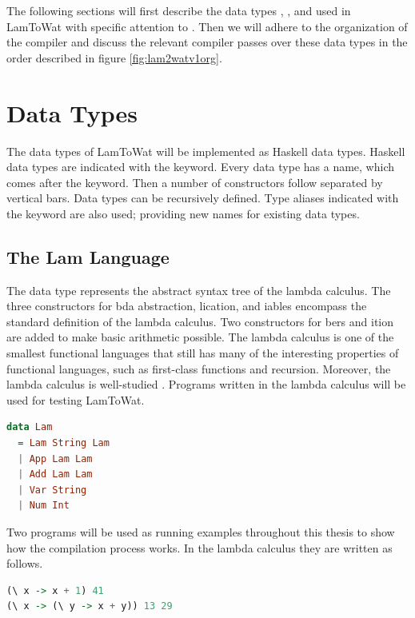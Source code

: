 The following sections will first describe the data types , , and  used in LamToWat with specific attention to . Then we will adhere to the organization of the compiler and discuss the relevant compiler passes over these data types in the order described in figure \ref{fig:lam2watv1org}.

\section{\label{section:datatypes}Data Types}
The data types of LamToWat will be implemented as Haskell data types. Haskell data types are indicated with the  keyword. Every data type has a name, which comes after the keyword. Then a number of constructors follow separated by vertical bars. Data types can be recursively defined. Type aliases indicated with the  keyword are also used; providing new names for existing data types.

\subsection{\label{subsection:expdata}The Lam Language}
The  data type represents the abstract syntax tree of the lambda calculus. The three constructors for bda abstraction, lication, and iables encompass the standard definition of the lambda calculus. Two constructors for bers and ition are added to make basic arithmetic possible. The lambda calculus is one of the smallest functional languages that still has many of the interesting properties of functional languages, such as first-class functions and recursion. Moreover, the lambda calculus is well-studied \autocite{barendregt1984lambda}. Programs written in the lambda calculus will be used for testing LamToWat.

\begin{lstlisting}[language=Haskell]
data Lam
  = Lam String Lam
  | App Lam Lam
  | Add Lam Lam
  | Var String
  | Num Int
\end{lstlisting}

Two programs will be used as running examples throughout this thesis to show how the compilation process works. In the lambda calculus they are written as follows.

\begin{lstlisting}[language=Haskell]
(\ x -> x + 1) 41
(\ x -> (\ y -> x + y)) 13 29
\end{lstlisting}

